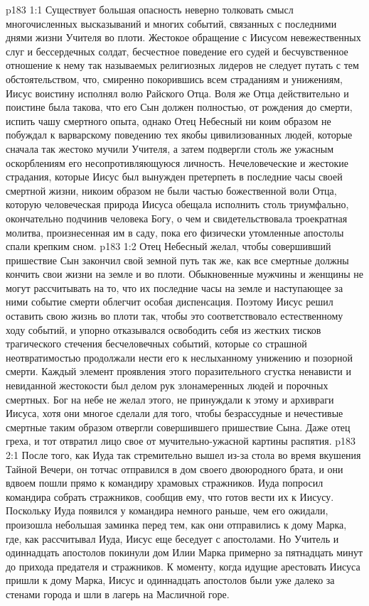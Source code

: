 \vs p183 1:1 Существует большая опасность неверно толковать смысл многочисленных высказываний и многих событий, связанных с последними днями жизни Учителя во плоти. Жестокое обращение с Иисусом невежественных слуг и бессердечных солдат, бесчестное поведение его судей и бесчувственное отношение к нему так называемых религиозных лидеров не следует путать с тем обстоятельством, что, смиренно покорившись всем страданиям и унижениям, Иисус воистину исполнял волю Райского Отца. Воля же Отца действительно и поистине была такова, что его Сын должен полностью, от рождения до смерти, испить чашу смертного опыта, однако Отец Небесный ни коим образом не побуждал к варварскому поведению тех якобы цивилизованных людей, которые сначала так жестоко мучили Учителя, а затем подвергли столь же ужасным оскорблениям его несопротивляющуюся личность. Нечеловеческие и жестокие страдания, которые Иисус был вынужден претерпеть в последние часы своей смертной жизни, никоим образом не были частью божественной воли Отца, которую человеческая природа Иисуса обещала исполнить столь триумфально, окончательно подчинив человека Богу, о чем и свидетельствовала троекратная молитва, произнесенная им в саду, пока его физически утомленные апостолы спали крепким сном.
\vs p183 1:2 Отец Небесный желал, чтобы совершивший пришествие Сын закончил свой земной путь  так же, как все смертные должны кончить свои жизни на земле и во плоти. Обыкновенные мужчины и женщины не могут рассчитывать на то, что их последние часы на земле и наступающее за ними событие смерти облегчит особая диспенсация. Поэтому Иисус решил оставить свою жизнь во плоти так, чтобы это соответствовало естественному ходу событий, и упорно отказывался освободить себя из жестких тисков трагического стечения бесчеловечных событий, которые со страшной неотвратимостью продолжали нести его к неслыханному унижению и позорной смерти. Каждый элемент проявления этого поразительного сгустка ненависти и невиданной жестокости был делом рук злонамеренных людей и порочных смертных. Бог на небе не желал этого, не принуждали к этому и архивраги Иисуса, хотя они многое сделали для того, чтобы безрассудные и нечестивые смертные таким образом отвергли совершившего пришествие Сына. Даже отец греха, и тот отвратил лицо свое от мучительно\hyp{}ужасной картины распятия.
\vs p183 2:1 После того, как Иуда так стремительно вышел из\hyp{}за стола во время вкушения Тайной Вечери, он тотчас отправился в дом своего двоюродного брата, и они вдвоем пошли прямо к командиру храмовых стражников. Иуда попросил командира собрать стражников, сообщив ему, что готов вести их к Иисусу. Поскольку Иуда появился у командира немного раньше, чем его ожидали, произошла небольшая заминка перед тем, как они отправились к дому Марка, где, как рассчитывал Иуда, Иисус еще беседует с апостолами. Но Учитель и одиннадцать апостолов покинули дом Илии Марка примерно за пятнадцать минут до прихода предателя и стражников. К моменту, когда идущие арестовать Иисуса пришли к дому Марка, Иисус и одиннадцать апостолов были уже далеко за стенами города и шли в лагерь на Масличной горе.
